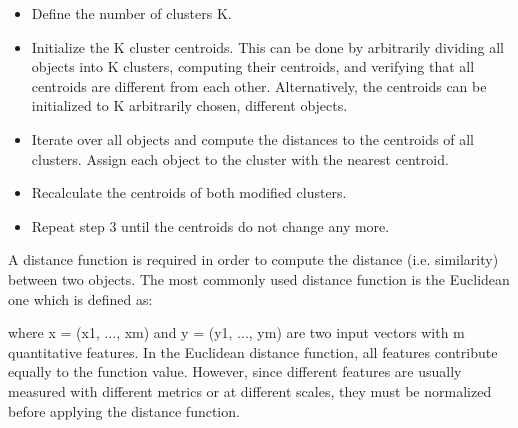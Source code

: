 \begin{itemize}
	\item Define the number of clusters K.
	
	\item Initialize the K cluster centroids. This can be done by arbitrarily dividing all objects into K clusters, computing their centroids, and verifying that all centroids are different from each other. Alternatively, the centroids can be initialized to K arbitrarily chosen, different objects.
	
	\item Iterate over all objects and compute the distances to the centroids of all clusters. Assign each object to the cluster with the nearest centroid.
	
	\item Recalculate the centroids of both modified clusters.
	
	\item Repeat step 3 until the centroids do not change any more.
\end{itemize}
A distance function is required in order to compute the
distance (i.e. similarity) between two objects. The most commonly used distance function is the Euclidean one which is defined as:

\begin{center}
\end{center}

where x = (x1, ..., xm) and y = (y1, ..., ym) are two input vectors with m quantitative features. In the Euclidean distance function, all features contribute equally to the function value. However, since different features are usually measured with different metrics or at different scales, they must be normalized
before applying the distance function.